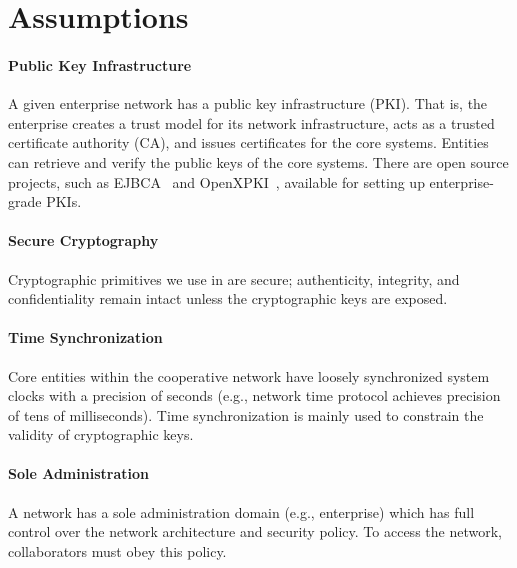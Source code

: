 

\section{Assumptions}
\label{sec:assumptions}

\paragraph{Public Key Infrastructure} 
A given enterprise network has a public key infrastructure (PKI). That is, the enterprise
creates a trust model for its network infrastructure, acts as a trusted certificate authority 
(CA), and issues certificates for the core systems. Entities can retrieve and verify the
public keys of the core systems. There are open source projects, such as EJBCA~\cite{ejbca} 
and OpenXPKI~\cite{openxpki}, available for setting up enterprise-grade PKIs.

\paragraph{Secure Cryptography} 
Cryptographic primitives we use in \name are secure; authenticity, integrity, and 
confidentiality remain intact unless the cryptographic keys are exposed.

\paragraph{Time Synchronization}
Core entities within the cooperative network have loosely synchronized system clocks with a
precision of seconds (e.g., network time protocol achieves precision of tens of milliseconds). 
Time synchronization is mainly used to constrain the validity of cryptographic keys.

\paragraph{Sole Administration}
A network has a sole administration domain (e.g., enterprise) which has full control over 
the network architecture and security policy. To access the network, collaborators 
must obey this policy.